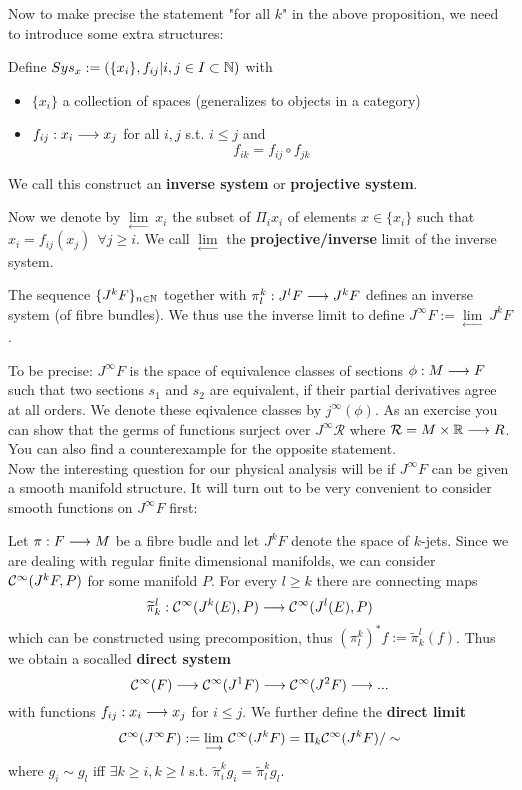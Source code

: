 Now to make precise the statement "for all $k$" in the above proposition, we need to introduce some extra structures:

\begin{definition}
\label{def:inverse_system}
  Define $Sys_x := (\{x_i\}, f_{ij} | i,j \in I \subset \mathbb{N})$ with
  \begin{itemize}
    \item $\{x_i\}$ a collection of spaces (generalizes to objects in a category)
    \item $f_{ij}:x_i \longrightarrow x_j$ for all $i,j$ s.t. $i \leq j$ and
    $$ f_{ik} = f_{ij} \circ f_{jk} $$
  \end{itemize}
  We call this construct an \textbf{inverse system} or \textbf{projective system}.
\end{definition}

Now we denote by $\underset{\longleftarrow}{\lim} \ x_i$ the subset of $\Pi_i x_i$ of elements $x\in \{ x_i\}$ such that $x_i = f_{ij}(x_j) \ \ \forall j \geq i$. We call $\underset{\longleftarrow}{\lim}$ the \textbf{projective/inverse} limit of the inverse system.

\begin{definition}
  The sequence $\{J^k F\}_{n\in\mathbb{N}}$ together with $\pi^k_l: J^l F \longrightarrow J^k F$ defines an inverse system (of fibre bundles). We thus use the inverse limit to define $J^\infty F := \underset{\longleftarrow}{\lim}\ J^k F$.
\end{definition}

To be precise: $J^\infty F$ is the space of equivalence classes of sections $\phi:M \lra F$ such that two sections $s_1$ and $s_2$ are equivalent, if their partial derivatives agree at all orders. We denote these eqivalence classes by $j^\infty(\phi)$. As an exercise you can show that the germs of functions surject over $J^\infty \mathcal{R}$ where $\mathcal{R} = M \times \mathbb{R} \longrightarrow R$. You can also find a counterexample for the opposite statement.\\

Now the interesting question for our physical analysis will be if $J^\infty F$ can be given a smooth manifold structure. It will turn out to be very convenient to consider smooth functions on $J^\infty F$ first:

\begin{definition}
  Let $\pi: F \longrightarrow M$ be a fibre budle and let $J^kF$ denote the space of $k$-jets. Since we are dealing with regular finite dimensional manifolds, we can consider $\mathcal{C}^{\infty}(J^kF, P)$ for some manifold $P$. For every $l\geq k$ there are connecting maps
  $$\widetilde \pi^l_k : \mathcal{C}^{\infty}(J^k(E), P) \longrightarrow \mathcal{C}^{\infty}(J^l(E), P)$$
  which can be constructed using precomposition, thus $(\pi^k_l)^* f := \widetilde \pi^l_k (f)$. Thus we obtain a socalled \textbf{direct system}
  $$ \mathcal{C}^{\infty}(F) \longrightarrow \mathcal{C}^{\infty}(J^1F) \longrightarrow \mathcal{C}^{\infty}(J^2F) \longrightarrow ... $$
  with functions $f_{ij}:x_i \longrightarrow x_j$ for $i\leq j$. We further define the \textbf{direct limit}
  $$\mathcal{C}^{\infty}(J^\infty F) := \underset{\longrightarrow}{\lim}\ \mathcal{C}^{\infty}(J^k F) = \Pi_k \mathcal{C}^{\infty}(J^k F) / \sim$$
  where $g_i \sim g_l$ iff $\exists k \geq i, k \geq l$ s.t. $\widetilde \pi^k_i g_i = \widetilde \pi^k_l g_l$.
\end{definition}

